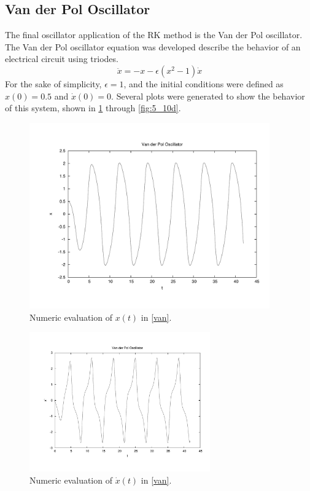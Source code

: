 \documentclass[12pt]{article}
\begin{document}
\subsection{Van der Pol Oscillator}
The final oscillator application of the RK method is the Van der Pol oscillator.  The Van der Pol oscillator equation was developed describe the behavior of an electrical circuit using triodes.
\begin{equation}
\label{van}
\ddot{x} = -x-\epsilon(x^2-1)\dot{x}
\end{equation}
For the sake of simplicity, $\epsilon=1$, and the initial conditions were defined as $x(0)=0.5$ and $\dot{x}(0)=0$.   Several plots were generated to show the behavior of this system, shown in \ref{fig:5_10a} through \ref{fig:5_10d}.
\begin{figure}[!h]
\centering
\includegraphics[width =110 mm, height = 80mm]{Fig_5_10_a.pdf}
\caption{Numeric evaluation of $x(t)$ in \eqref{van}.}
\label{fig:5_10a}
\end{figure}
\begin{figure}[!h]
\centering
\includegraphics[width =110 mm, height = 60mm]{Fig_5_10_b.pdf}
\caption{Numeric evaluation of $\dot{x}(t)$ in \eqref{van}.}
\label{fig:5_10b}
\end{figure}
\end{document}
